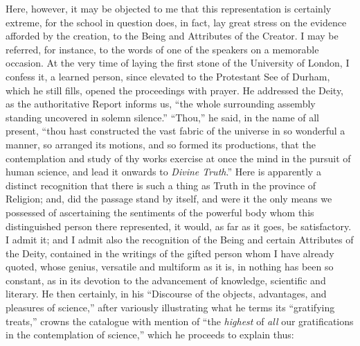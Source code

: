 Here, however, it may be objected to me that this representation is
certainly extreme, for the school in question does, in fact, lay great
stress on the evidence afforded by the creation, to the Being and
Attributes of the Creator. I may be referred, for instance, to the
words of one of the speakers on a memorable occasion. At the very time
of laying the first stone of the University of London, I confess it, a
learned person, since elevated to the Protestant See of Durham, which
he still fills, opened the proceedings with prayer. He addressed the
Deity, as the authoritative Report informs us, ``the whole
surrounding assembly standing uncovered in solemn silence.''
``Thou,'' he said, in the name of all present, ``thou hast
constructed the vast fabric of the universe in so wonderful a manner,
so arranged its motions, and so formed its productions, that the
contemplation and study of thy works exercise at once the mind in the
pursuit of human science, and lead it onwards to \emph{Divine Truth}.''
Here is apparently a distinct recognition that there is such a thing
as Truth in the province of Religion; and, did the passage stand by
itself, and were it the only means we possessed of ascertaining the
sentiments of the powerful body whom this distinguished person there
represented, it would, as far as it goes, be satisfactory. I admit it;
and I admit also the recognition of the Being and certain Attributes
of the Deity, contained in the writings of the gifted person whom I
have already quoted, whose genius, versatile and multiform as it is,
in nothing has been so constant, as in its devotion to the advancement
of knowledge, scientific and literary. He then certainly, in his
``Discourse of the objects, advantages, and pleasures of
science,'' after variously illustrating what he terms its
``gratifying treats,'' crowns the catalogue with mention of
``the \emph{highest} of \emph{all} our gratifications in the
contemplation of science,'' which he proceeds to explain thus:

